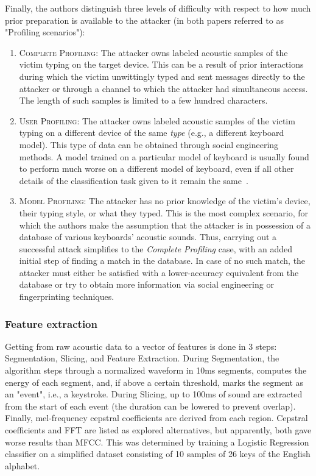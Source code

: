 \documentclass[../main.tex]{subfiles}
\begin{document}
Finally, the authors distinguish three levels of difficulty with respect to how much prior preparation is available to the attacker (in both papers referred to as "Profiling scenarios"):
\begin{enumerate}
    \item \textsc{Complete Profiling}: The attacker owns labeled acoustic samples of the victim typing on the target device. This can be a result of prior interactions during which the victim unwittingly typed and sent messages directly to the attacker or through a channel to which the attacker had simultaneous access. The length of such samples is limited to a few hundred characters.
    \item \textsc{User Profiling}: The attacker owns labeled acoustic samples of the victim typing on a different device of the same \emph{type} (e.g., a different keyboard model). This type of data can be obtained through social engineering methods. A model trained on a particular model of keyboard is usually found to perform much worse on a different model of keyboard, even if all other details of the classification task given to it remain the same~\cite{og2004}.
    \item \textsc{Model Profiling}: The attacker has no prior knowledge of the victim's device, their typing style, or what they typed. This is the most complex scenario, for which the authors make the assumption that the attacker is in possession of a database of various keyboards' acoustic sounds. Thus, carrying out a successful attack simplifies to the \emph{Complete Profiling} case, with an added initial step of finding a match in the database. In case of no such match, the attacker must either be satisfied with a lower-accuracy equivalent from the database or try to obtain more information via social engineering or fingerprinting techniques.
\end{enumerate}

\subsubsection{Feature extraction}\label{sec:skype_feature_extraction}
Getting from raw acoustic data to a vector of features is done in 3 steps: Segmentation, Slicing, and Feature Extraction. During Segmentation, the algorithm steps through a normalized waveform in 10ms segments, computes the energy of each segment, and, if above a certain threshold, marks the segment as an "event", i.e., a keystroke. During Slicing, up to 100ms of sound are extracted from the start of each event (the duration can be lowered to prevent overlap). Finally, mel-frequency cepstral coefficients are derived from each region. Cepstral coefficients and FFT are listed as explored alternatives, but apparently, both gave worse results than MFCC. This was determined by training a Logistic Regression classifier on a simplified dataset consisting of 10 samples of 26 keys of the English alphabet.
\end{document}
